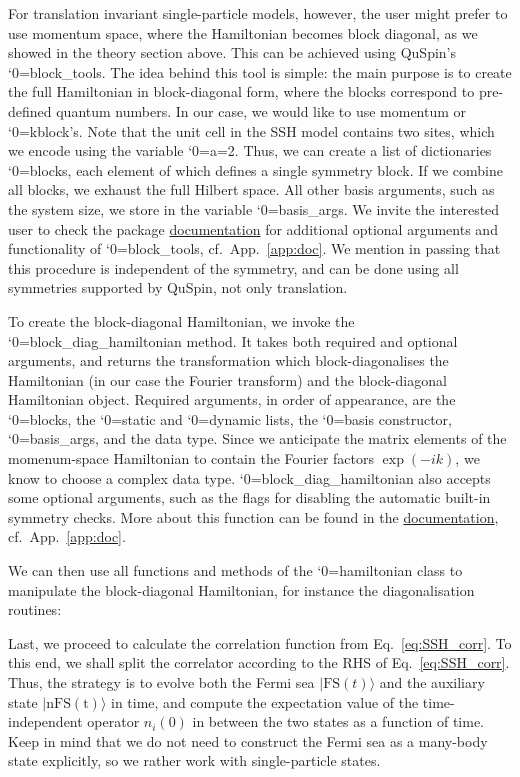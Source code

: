 \documentclass{SciPost}
\newcommand\0{\scalebox{-1}[1]{0}}
\let\svttfamily\ttfamily
\renewcommand\ttfamily{\svttfamily\catcode`0=\active }
\renewcommand\texttt{\bgroup\ttfamily\texttthelp}
\def\texttthelp#1{#1\egroup}
\newcommand{\SSHcode}{example5.py}
\begin{document}
For translation invariant single-particle models, however, the user might prefer to use momentum space, where the Hamiltonian becomes block diagonal, as we showed in the theory section above. This can be achieved using QuSpin's \texttt{block\_tools}. The idea behind this tool is simple: the main purpose is to create the full Hamiltonian in block-diagonal form, where the blocks correspond to pre-defined quantum numbers. In our case, we would like to use momentum or \texttt{kblock}'s. Note that the unit cell in the SSH model contains two sites, which we encode using the variable \texttt{a=2}. Thus, we can create a list of dictionaries \texttt{blocks}, each element of which defines a single symmetry block. If we combine all blocks, we exhaust the full Hilbert space. All other basis arguments, such as the system size, we store in the variable \texttt{basis\_args}. We invite the interested user to check the package \href{http://weinbe58.github.io/QuSpin/index.html}{documentation} for additional optional arguments and functionality of \texttt{block\_tools}, cf.~App.~\ref{app:doc}. We mention in passing that this procedure is independent of the symmetry, and can be done using all symmetries supported by QuSpin, not only translation.

To create the block-diagonal Hamiltonian, we invoke the \texttt{block\_diag\_hamiltonian} method. It takes both required and optional arguments, and returns the transformation which block-diagonalises the Hamiltonian (in our case the Fourier transform) and the block-diagonal Hamiltonian object. Required arguments, in order of appearance, are the \texttt{blocks}, the \texttt{static} and \texttt{dynamic} lists, the \texttt{basis} constructor, \texttt{basis\_args}, and the data type. Since we anticipate the matrix elements of the momenum-space Hamiltonian to contain the Fourier factors $\exp(-ik)$, we know to choose a complex data type. \texttt{block\_diag\_hamiltonian} also accepts some optional arguments, such as the flags for disabling the automatic built-in symmetry checks. More about this function can be found in the \href{http://weinbe58.github.io/QuSpin/index.html}{documentation}, cf.~App.~\ref{app:doc}.

We can then use all functions and methods of the \texttt{hamiltonian} class to manipulate the block-diagonal Hamiltonian, for instance the diagonalisation routines:


Last, we proceed to calculate the correlation function from Eq.~\eqref{eq:SSH_corr}. To this end, we shall split the correlator according to the RHS of Eq.~\eqref{eq:SSH_corr}. Thus, the strategy is to evolve both the Fermi sea $|\mathrm{FS}(t)\rangle$ and the auxiliary state $|\mathrm{nFS(t)}\rangle$ in time, and compute the expectation value of the time-independent operator $n_i(0)$ in between the two states as a function of time. Keep in mind that we do not need to construct the Fermi sea as a many-body state explicitly, so we rather work with single-particle states.
\end{document}
